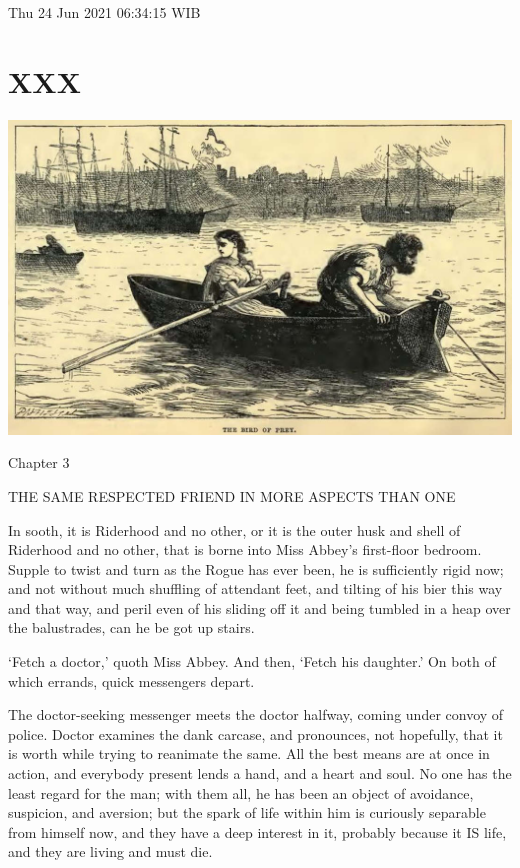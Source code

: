 Thu 24 Jun 2021 06:34:15 WIB

\chapter{XXX}

\includegraphics[scale=2.3]{01-01-01}

Chapter 3

THE SAME RESPECTED FRIEND IN MORE ASPECTS THAN ONE


In sooth, it is Riderhood and no other, or it is the outer husk and
shell of Riderhood and no other, that is borne into Miss Abbey’s
first-floor bedroom. Supple to twist and turn as the Rogue has ever
been, he is sufficiently rigid now; and not without much shuffling of
attendant feet, and tilting of his bier this way and that way, and
peril even of his sliding off it and being tumbled in a heap over the
balustrades, can he be got up stairs.

‘Fetch a doctor,’ quoth Miss Abbey. And then, ‘Fetch his daughter.’ On
both of which errands, quick messengers depart.

The doctor-seeking messenger meets the doctor halfway, coming under
convoy of police. Doctor examines the dank carcase, and pronounces, not
hopefully, that it is worth while trying to reanimate the same. All the
best means are at once in action, and everybody present lends a hand,
and a heart and soul. No one has the least regard for the man; with them
all, he has been an object of avoidance, suspicion, and aversion; but
the spark of life within him is curiously separable from himself now,
and they have a deep interest in it, probably because it IS life, and
they are living and must die.

